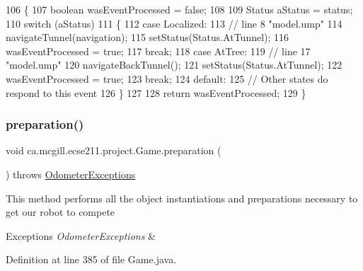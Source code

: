 \begin{DoxyCode}
106   \{
107     \textcolor{keywordtype}{boolean} wasEventProcessed = \textcolor{keyword}{false};
108     
109     Status aStatus = status;
110     \textcolor{keywordflow}{switch} (aStatus)
111     \{
112       \textcolor{keywordflow}{case} Localized:
113         \textcolor{comment}{// line 8 "model.ump"}
114         navigateTunnel(navigation);
115         setStatus(Status.AtTunnel);
116         wasEventProcessed = \textcolor{keyword}{true};
117         \textcolor{keywordflow}{break};
118       \textcolor{keywordflow}{case} AtTree:
119         \textcolor{comment}{// line 17 "model.ump"}
120         navigateBackTunnel();
121         setStatus(Status.AtTunnel);
122         wasEventProcessed = \textcolor{keyword}{true};
123         \textcolor{keywordflow}{break};
124       \textcolor{keywordflow}{default}:
125         \textcolor{comment}{// Other states do respond to this event}
126     \}
127 
128     \textcolor{keywordflow}{return} wasEventProcessed;
129   \}
\end{DoxyCode}
\mbox{\label{enumca_1_1mcgill_1_1ecse211_1_1project_1_1_game_a8f3c5b18f98ee56f5f03afd72fa40bcb}} 
\subsubsection{\texorpdfstring{preparation()}{preparation()}}
{\footnotesize\ttfamily void ca.\+mcgill.\+ecse211.\+project.\+Game.\+preparation (\begin{DoxyParamCaption}{ }\end{DoxyParamCaption}) throws \hyperlink{classca_1_1mcgill_1_1ecse211_1_1odometer_1_1_odometer_exceptions}{Odometer\+Exceptions}}

This method performs all the object instantiations and preparations necessary to get our robot to compete


\begin{DoxyExceptions}{Exceptions}
{\em Odometer\+Exceptions} & \\
\hline
\end{DoxyExceptions}


Definition at line 385 of file Game.\+java.


